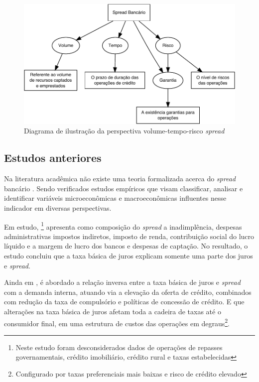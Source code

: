\documentclass[
  12pt,
  12pt,
  openright,
  oneside,
  a4paper,
  chapter=TITLE,
  section=TITLE,
  subsection=TITLE,
  subsubsection=TITLE,
  portugues,
  sumario=tradicional]{abntex2}
\begin{document}
\begin{figure}[!htbp]
\vspace{20pt}
\caption{Diagrama de ilustração da perspectiva volume-tempo-risco  \emph{spread}}
\vspace{-4mm}

\begin{center}\includegraphics{12-exportedfigures/diagram.spread.vol.tem,ris-1} \end{center}
\vspace{-3mm}
\label{fig:diagramd}
\vspace{-2mm}
\end{figure}

\subsection{Estudos anteriores}

Na literatura acadêmica não existe uma teoria formalizada acerca do \emph{spread} bancário \cite{timotio:2018}. Sendo verificados estudos empíricos que visam classificar, analisar e identificar variáveis microeconômicas e macroeconômicas influentes nesse indicador em diversas perspectivas.

Em estudo, \textcite{BCB:1999}\footnote{Neste estudo foram desconsiderados dados de operações de repasses governamentais, crédito imobiliário, crédito rural e taxas estabelecidas} apresenta como composição do \emph{spread} a inadimplência, despesas administrativas impostos indiretos, imposto de renda, contribuição social do lucro líquido e a margem de lucro dos bancos e despesas de captação. No resultado, o estudo concluiu que a taxa básica de juros explicam somente uma parte dos juros e \emph{spread}.

Ainda em \textcite{BCB:1999}, é abordado a relação inversa entre a taxa básica de juros e \emph{spread} com a demanda interna, atuando via a elevação da oferta de crédito, combinados com redução da taxa de compulsório e políticas de concessão de crédito. E que alterações na taxa básica de juros afetam toda a cadeira de taxas até o consumidor final, em uma estrutura de custos das operações em degraus\footnote{Configurado por taxas preferenciais mais baixas e risco de crédito elevado}.
\end{document}
